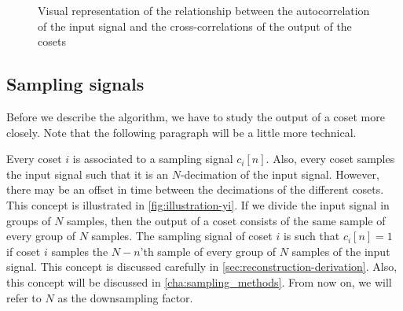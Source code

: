 \documentclass[a4paper, openany, oneside]{memoir}
\begin{document}
\begin{figure}[h]
\centering
{}
\caption{Visual representation of the relationship between the autocorrelation of the input signal and the cross-correlations of the output of the cosets}\label{tkz:overview-vars}
\end{figure}

\subsection{Sampling signals}
Before we describe the algorithm, we have to study the output of a coset more closely. Note that the following paragraph will be a little more technical.

Every coset $i$ is associated to a sampling signal $c_i[n]$. Also, every coset samples the input signal such that it is an $N$-decimation of the input signal. However, there may be an offset in time between the decimations of the different cosets. This concept is illustrated in \cref{fig:illustration-yi}. If we divide the input signal in groups of $N$ samples, then the output of a coset consists of the same sample of every group of $N$ samples.  The sampling signal of coset $i$ is such that $c_i[n]=1$ if coset $i$ samples the $N-n$'th sample of every group of $N$ samples of the input signal. This concept is discussed carefully in \cref{sec:reconstruction-derivation}. Also, this concept will be discussed in \cref{cha:sampling_methods}. From now on, we will refer to $N$ as the downsampling factor.
\end{document}

